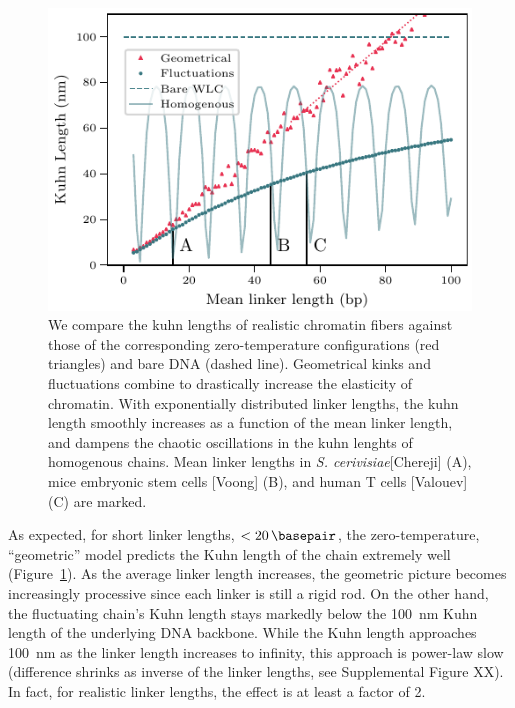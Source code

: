 \documentclass[%
 reprint,
superscriptaddress,
showpacs,preprintnumbers,
 amsmath,amssymb,
 aps,
 prl,
]{revtex4-1}
\begin{document}
\begin{figure}[t]
    \centering
    \includegraphics[width=0.95\linewidth]{./figures/fig3_kuhn_exponential.pdf}
    \caption{We compare the kuhn lengths of realistic chromatin fibers
    against those of the corresponding zero-temperature configurations (red
    triangles) and bare DNA (dashed line). Geometrical kinks and fluctuations
    combine to drastically increase the elasticity of chromatin. With exponentially
    distributed linker lengths, the kuhn length smoothly increases as a function
    of the mean linker length, and dampens the chaotic oscillations in the kuhn
    lenghts of homogenous chains. Mean linker
    lengths in \textit{S.  cerivisiae}[Chereji] (A), mice embryonic stem cells
    [Voong] (B), and human T cells  [Valouev] (C)  are marked.}\label{fig:exp-kuhns}
\end{figure}

As expected, for short linker lengths, $<\SI{20}{\basepair}$, the
    zero-temperature, ``geometric'' model predicts the Kuhn length of the chain
    extremely well (Figure~\ref{fig:exp-kuhns}).
As the average linker length
    increases, the geometric picture becomes increasingly processive since each
    linker is still a rigid rod.
On the other hand, the fluctuating chain's Kuhn length stays markedly below the
    \SI{100}{\nano\metre} Kuhn length of the underlying DNA backbone.
While the Kuhn length approaches \SI{100}{\nano\metre} as the linker length
    increases to infinity, this approach is power-law slow (difference shrinks
    as inverse of the linker lengths, see Supplemental Figure XX).
In fact, for realistic linker lengths, the effect is at least a factor of 2.
\end{document}

